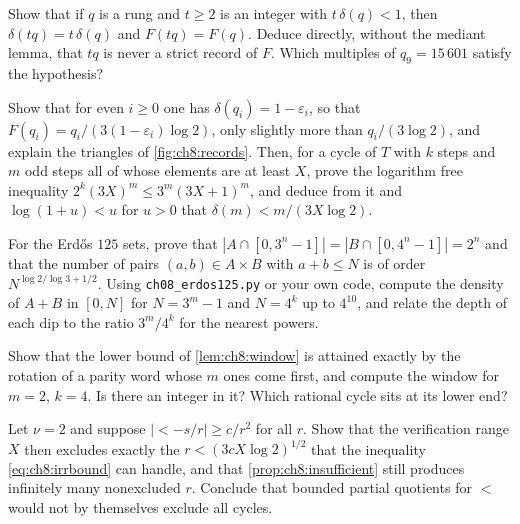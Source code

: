 \begin{exercise}
Show that if $q$ is a rung and $t\geq2$ is an integer with $t\,\delta(q)<1$,
then $\delta(tq)=t\,\delta(q)$ and $F(tq)=F(q)$. Deduce directly, without the
mediant lemma, that $tq$ is never a strict record of $F$. Which multiples of
$q_9=15\,601$ satisfy the hypothesis?
\end{exercise}

\begin{exercise}
Show that for even $i\geq0$ one has $\delta(q_i)=1-\varepsilon_i$, so that $F(q_i)=q_i/(3(1-\varepsilon_i)\log2)$, only slightly more than $q_i/(3\log2)$, and explain the triangles of \cref{fig:ch8:records}. Then, for a cycle of $T$ with $k$ steps and $m$ odd steps all of whose elements are at least $X$, prove the logarithm free inequality $2^k(3X)^m\leq3^m(3X+1)^m$, and deduce from it and $\log(1+u)<u$ for $u>0$ that $\delta(m)<m/(3X\log2)$.
\end{exercise}

\begin{exercise}
For the Erd\H{o}s $125$ sets, prove that $|A\cap[0,3^n-1]|=|B\cap[0,4^n-1]|=2^n$
and that the number of pairs $(a,b)\in A\times B$ with $a+b\leq N$ is of order
$N^{\log2/\log3+1/2}$. Using \texttt{ch08\_erdos125.py} or your own code,
compute the density of $A+B$ in $[0,N]$ for $N=3^m-1$ and $N=4^k$ up to
$4^{10}$, and relate the depth of each dip to the ratio $3^m/4^k$ for the
nearest powers.
\end{exercise}

\begin{exercise}
Show that the lower bound of \cref{lem:ch8:window} is attained exactly by the
rotation of a parity word whose $m$ ones come first, and compute the window for
$m=2$, $k=4$. Is there an integer in it? Which rational cycle sits at its lower
end?
\end{exercise}

\begin{exercise}
Let $\nu=2$ and suppose $|\lt-s/r|\geq c/r^2$ for all $r$. Show that the
verification range $X$ then excludes exactly the $r<(3cX\log2)^{1/2}$ that the
inequality \eqref{eq:ch8:irrbound} can handle, and that \cref{prop:ch8:insufficient}
still produces infinitely many nonexcluded $r$. Conclude that bounded partial
quotients for $\lt$ would not by themselves exclude all cycles.
\end{exercise}

